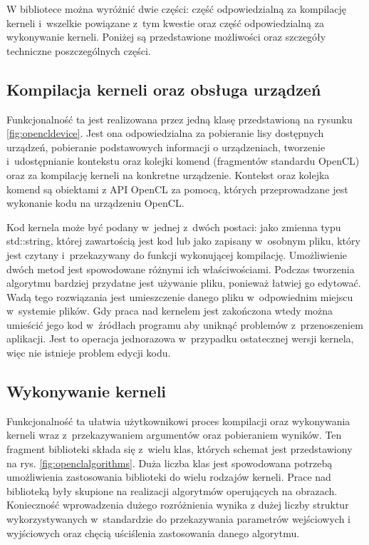 W bibliotece można wyróżnić dwie części: część odpowiedzialną za kompilację kerneli i~wszelkie powiązane z~tym kwestie oraz część odpowiedzialną za wykonywanie kerneli.
Poniżej są przedstawione możliwości oraz szczegóły techniczne poszczególnych części.

\subsection{Kompilacja kerneli oraz obsługa urządzeń}
\label{subsec:kompilacjakerneli}
Funkcjonalność ta jest realizowana przez jedną klasę przedstawioną na rysunku \ref{fig:opencldevice}. Jest ona odpowiedzialna za pobieranie lisy dostępnych urządzeń, pobieranie podstawowych informacji o urządzeniach, tworzenie i~udostępnianie kontekstu oraz kolejki komend (fragmentów standardu OpenCL) oraz za kompilację kerneli na konkretne urządzenie. Kontekst oraz kolejka komend są obiektami z API OpenCL za pomocą, których przeprowadzane jest wykonanie kodu na urządzeniu OpenCL.

Kod kernela może być podany w~jednej z~dwóch postaci: jako zmienna typu std::string, której zawartością jest kod lub jako zapisany w~osobnym pliku, który jest czytany i~przekazywany do funkcji wykonującej kompilację. Umożliwienie dwóch metod jest spowodowane różnymi ich właściwościami. Podczas tworzenia algorytmu bardziej przydatne jest używanie pliku, ponieważ łatwiej go edytować.  Wadą tego rozwiązania jest umieszczenie danego pliku w~odpowiednim miejscu w~systemie plików. Gdy praca nad kernelem jest zakończona wtedy można umieścić jego kod w~źródłach programu aby uniknąć problemów z~przenoszeniem aplikacji. Jest to operacja jednorazowa w~przypadku ostatecznej wersji kernela, więc nie istnieje problem edycji kodu.

\subsection{Wykonywanie kerneli}
\label{subsec:wykonywaniekerneli}
Funkcjonalność ta ułatwia użytkownikowi proces kompilacji oraz wykonywania kerneli wraz z~przekazywaniem argumentów oraz pobieraniem wyników. Ten fragment biblioteki składa się z~wielu klas, których schemat jest przedstawiony na rys. \ref{fig:openclalgorithms}. Duża liczba klas jest spowodowana potrzebą umożliwienia zastosowania biblioteki do wielu rodzajów kerneli. Prace nad biblioteką były skupione na realizacji algorytmów operujących na obrazach. Konieczność wprowadzenia dużego rozróżnienia wynika z dużej liczby struktur wykorzystywanych w~standardzie do przekazywania parametrów wejściowych i wyjściowych oraz chęcią uściślenia zastosowania danego algorytmu.

